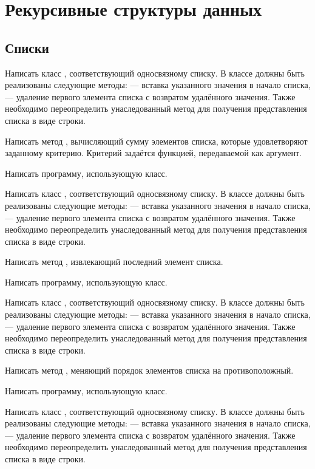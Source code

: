 \section{Рекурсивные структуры данных}

\subsection{Списки}

\task Написать класс , соответствующий
односвязному списку. В классе должны быть реализованы следующие
методы:  — вставка указанного значения в начало списка,
 — удаление первого элемента списка с возвратом удалённого
значения.  Также необходимо переопределить унаследованный метод
 для получения представления списка в виде строки.

Написать метод , вычисляющий сумму элементов списка, которые
удовлетворяют заданному критерию. Критерий задаётся функцией,
передаваемой как аргумент.

Написать программу, использующую класс.

\task Написать класс , соответствующий
односвязному списку. В классе должны быть реализованы следующие
методы:  — вставка указанного значения в начало списка,
 — удаление первого элемента списка с возвратом удалённого
значения.  Также необходимо переопределить унаследованный метод
 для получения представления списка в виде строки.

Написать метод , извлекающий последний элемент списка.

Написать программу, использующую класс.

\task Написать класс , соответствующий
односвязному списку. В классе должны быть реализованы следующие
методы:  — вставка указанного значения в начало списка,
 — удаление первого элемента списка с возвратом удалённого
значения.  Также необходимо переопределить унаследованный метод
 для получения представления списка в виде строки.

Написать метод , меняющий порядок элементов списка на
противоположный.

Написать программу, использующую класс.

\task Написать класс , соответствующий
односвязному списку. В классе должны быть реализованы следующие
методы:  — вставка указанного значения в начало списка,
 — удаление первого элемента списка с возвратом удалённого
значения.  Также необходимо переопределить унаследованный метод
 для получения представления списка в виде строки.

